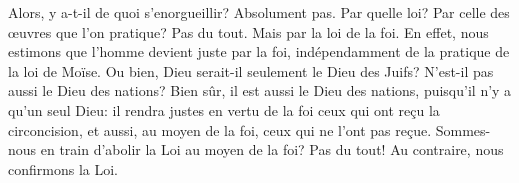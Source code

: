 Alors, y a-t-il de quoi s'enorgueillir?
	Absolument pas.
Par quelle loi? Par celle des œuvres que l’on pratique?
	Pas du tout.
	Mais par la loi de la foi.
En effet, nous estimons que l’homme devient juste par la foi,
	indépendamment de la pratique de la loi de Moïse.
Ou bien, Dieu serait-il seulement le Dieu des Juifs?
N’est-il pas aussi le Dieu des nations?
Bien sûr, il est aussi le Dieu des nations,
	puisqu’il n’y a qu’un seul Dieu:
	il rendra justes en vertu de la foi ceux qui ont reçu la circoncision,
	et aussi, au moyen de la foi, ceux qui ne l’ont pas reçue.
Sommes-nous en train d’abolir la Loi au moyen de la foi?
	Pas du tout! Au contraire, nous confirmons la Loi.
